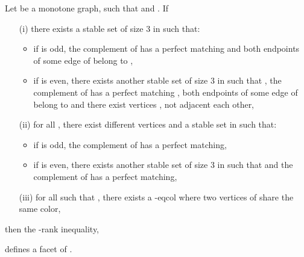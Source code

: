 \begin{tthm} \label{T2RANK1}
Let  be a monotone graph,  such that  and . If
\begin{enumerate}
\item[(i)] there exists a stable set  of size 3 in  such that:
\begin{itemize}
\item if  is odd, the complement of  has a perfect matching  and both endpoints of some edge
of  belong to ,
\item if  is even, there exists another stable set  of size 3 in  such that
, the complement of  has a perfect matching , both
endpoints of some edge of  belong to  and there exist vertices ,  not
adjacent each other, 
\end{itemize}
\item[(ii)] for all , there exist different vertices 
and a stable set  in  such that:
\begin{itemize}
\item if  is odd, the complement of  has a perfect matching,
\item if  is even, there exists another stable set  of size 3 in  such that
 and the complement of  has a perfect matching,
\end{itemize}
\item[(iii)] for all  such that , there exists a -eqcol
where two vertices of  share the same color,
\end{enumerate}
then the -rank inequality, \ie

defines a facet of .
\end{tthm}
